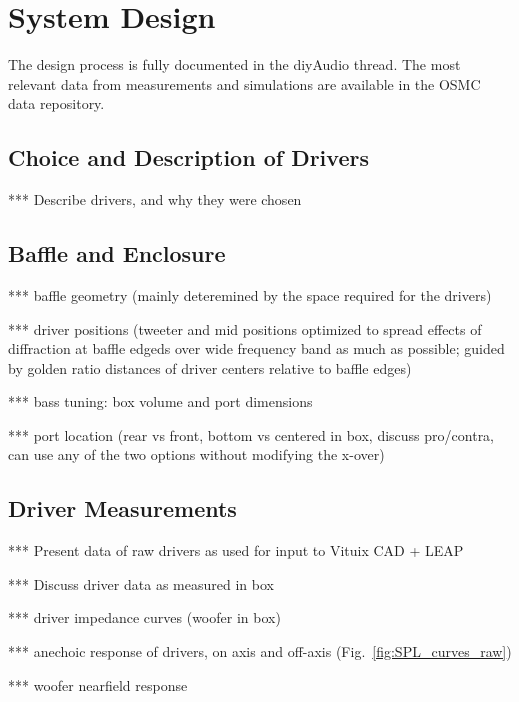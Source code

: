 \documentclass[12pt,a4paper]{article}
\providecommand{\figr}[1]{Fig.~\ref{fig:#1}}
\providecommand{\seclabel}[1]{\label{sec:#1}}
\begin{document}
\section{System Design}

The design process is fully documented in the diyAudio thread. The most relevant data from measurements and simulations are available in the OSMC data repository\cite{osmc_datarepo}.

\subsection{Choice and Description of Drivers}

*** Describe drivers, and why they were chosen


\subsection{Baffle and Enclosure}

*** baffle geometry (mainly deteremined by the space required for the drivers)

*** driver positions (tweeter and mid positions optimized to spread effects of diffraction at baffle edgeds over wide frequency band as much as possible; guided by golden ratio distances of driver centers relative to baffle edges)

*** bass tuning: box volume and port dimensions

*** port location (rear vs front, bottom vs centered in box, discuss pro/contra, can use any of the two options without modifying the x-over)


\subsection{Driver Measurements}\seclabel{driver_measurements}

*** Present data of raw drivers as used for input to Vituix CAD + LEAP

*** Discuss driver data as measured in box

*** driver impedance curves (woofer in box)

*** anechoic response of drivers, on axis and off-axis (\figr{SPL_curves_raw})

*** woofer nearfield response
\end{document}
